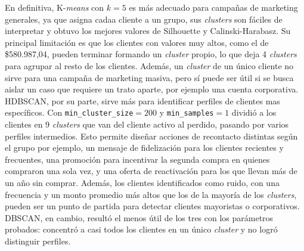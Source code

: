 \documentclass[a4paper,10pts,openany]{book}
\begin{document}
	En definitiva, K-\emph{means} con $k=5$ es más adecuado para campañas de marketing generales, ya que asigna cadaa cliente a un grupo, sus \emph{clusters} son fáciles de interpretar y obtuvo los mejores valores de Silhouette y Calinski-Harabasz. Su principal limitación es que los clientes con valores muy altos, como el de \$580.987{,}04, pueden terminar formando un \emph{cluster} propio, lo que deja 4 \emph{clusters} para agrupar al resto de los clientes.  Además, un \emph{cluster} de un único cliente no sirve para una campaña de marketing masiva, pero sí puede ser útil si se busca aislar un caso que requiere un trato aparte, por ejemplo una cuenta corporativa. HDBSCAN, por su parte, sirve más para identificar perfiles de clientes mas específicos. Con \texttt{min\_cluster\_size}$=200$ y \texttt{min\_samples}$=1$ dividió a los clientes en 9 \emph{clusters} que van del cliente activo al perdido, pasando por varios perfiles intermedios. Esto permite diseñar acciones de recontacto distintas según el grupo por ejemplo, un mensaje de fidelización para los clientes recientes y frecuentes, una promoción para incentivar la segunda compra en quienes compraron una sola vez, y una oferta de reactivación para los que llevan más de un año sin comprar. Además, los clientes identificados como ruido, con una frecuencia y un monto promedio más altos que los de la mayoría de los \emph{clusters}, pueden ser un punto de partida para detectar clientes mayoristas o corporativos. DBSCAN, en cambio, resultó el menos útil de los tres con los parámetros probados: concentró a casi todos los clientes en un único \emph{cluster} y no logró distinguir perfiles.
	
	
	
	
	
\end{document}
